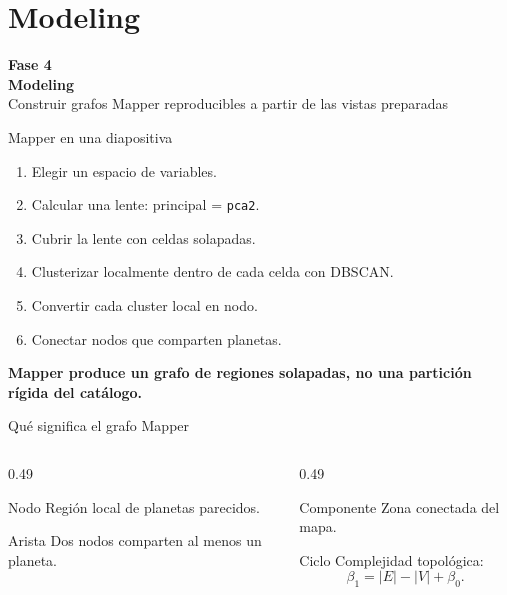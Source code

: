 \documentclass[aspectratio=169,10pt]{beamer}
\newcommand{\takeaway}[1]{\begin{center}\small\textbf{#1}\end{center}}
\newcommand{\phasebox}[3]{
  \begin{center}
    \vspace{1.2em}
    {\Large\textbf{#1}}\\[0.5em]
    {\huge\textbf{#2}}\\[0.8em]
    {\large #3}
  \end{center}
}
\begin{document}
\section{Modeling}

\begin{frame}[plain]
  \phasebox{Fase 4}{Modeling}{Construir grafos Mapper reproducibles a partir de las vistas preparadas}
\end{frame}

\begin{frame}{Mapper en una diapositiva}
  \begin{enumerate}
    \item Elegir un espacio de variables.
    \item Calcular una lente: principal = \texttt{pca2}.
    \item Cubrir la lente con celdas solapadas.
    \item Clusterizar localmente dentro de cada celda con DBSCAN.
    \item Convertir cada cluster local en nodo.
    \item Conectar nodos que comparten planetas.
  \end{enumerate}

  \takeaway{Mapper produce un grafo de regiones solapadas, no una partici\'on r\'igida del cat\'alogo.}
\end{frame}

\begin{frame}{Qu\'e significa el grafo Mapper}
  \begin{columns}[T,onlytextwidth]
    \begin{column}{0.49\textwidth}
      \begin{block}{Nodo}
        Regi\'on local de planetas parecidos.
      \end{block}
      \begin{block}{Arista}
        Dos nodos comparten al menos un planeta.
      \end{block}
    \end{column}
    \begin{column}{0.49\textwidth}
      \begin{block}{Componente}
        Zona conectada del mapa.
      \end{block}
      \begin{block}{Ciclo}
        Complejidad topol\'ogica:
        \[
          \beta_1 = |E| - |V| + \beta_0.
        \]
      \end{block}
    \end{column}
  \end{columns}
\end{frame}
\end{document}
